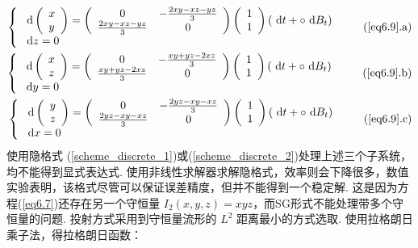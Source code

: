 \begin{align*}
\left\{
\begin{array}{l}
\md\left(\begin{array}{l}
x \\
y
\end{array}\right)=\left(\begin{array}{cc}
0 & -\frac{2 x y-x z-y z}{3} \\
\frac{2 x y-x z-y z}{3} & 0
\end{array}\right)\left(\begin{array}{l}
1 \\
1
\end{array}\right)(\md t + \circ \md B_t) \\
\md z=0
\end{array}       
\right.        \tag{\ref{eq6.9}{.a}}\\
\left\{\begin{array}{l}
\md\left(\begin{array}{c}
x \\
z
\end{array}\right)=\left(\begin{array}{cc}
0 & -\frac{x y+y z-2 x z}{3} \\
\frac{x y+y z-2 x z}{3} & 0
\end{array}\right)\left(\begin{array}{l}
1 \\
1
\end{array}\right)(\md t + \circ \md B_t) \\
\md y=0
\end{array}
\right.        \tag{\ref{eq6.9}{.b}}\\
\left\{
\begin{array}{l}
\md\left(\begin{array}{l}
y \\
z
\end{array}\right)=\left(\begin{array}{cc}
0 & -\frac{2 y z-x y-x z}{3} \\
\frac{2 y z-x y-x z}{3} & 0
\end{array}\right)\left(\begin{array}{l}
1 \\
1
\end{array}\right)(\md t + \circ \md B_t) \\
\md x=0
\end{array}     
\right.        \tag{\ref{eq6.9}{.c}}
\end{align*}
使用隐格式 (\ref{scheme_discrete_1})或(\ref{scheme_discrete_2})处理上述三个子系统，均不能得到显式表达式. 使用非线性求解器求解隐格式，效率则会下降很多，数值实验表明，该格式尽管可以保证误差精度，但并不能得到一个稳定解. 这是因为方程(\ref{eq6.7})还存在另一个守恒量 $I_2(x,y,z) = xyz$，而SG形式不能处理带多个守恒量的问题. 投射方式采用到守恒量流形的 $L^2$ 距离最小的方式选取. 使用拉格朗日乘子法，得拉格朗日函数：
